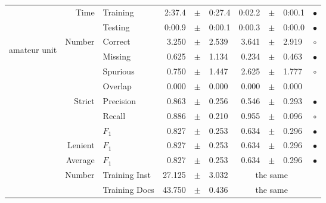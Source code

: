 \begin{longtable}{|r|r|l||rcl|rcl|c|}
\cline{2-10} & \multirow{2}{*}{      Time} &        Training &      2:37.4 &  $\pm$  &      0:27.4 &      0:02.2 &  $\pm$  &      0:00.1 & $\bullet$ \\
\cline{3-10} &                             &         Testing &      0:00.9 &  $\pm$  &      0:00.1 &      0:00.3 &  $\pm$  &      0:00.0 & $\bullet$ \\
\hline
\hline
\multirow{11}{*}{\begin{sideways}amateur unit\end{sideways} }
             & \multirow{4}{*}{    Number} &         Correct &       3.250 &  $\pm$  &       2.539 &       3.641 &  $\pm$  &       2.919 & $\circ$ \\
\cline{3-10} &                             &         Missing &       0.625 &  $\pm$  &       1.134 &       0.234 &  $\pm$  &       0.463 & $\bullet$ \\
\cline{3-10} &                             &        Spurious &       0.750 &  $\pm$  &       1.447 &       2.625 &  $\pm$  &       1.777 & $\circ$ \\
\cline{3-10} &                             &         Overlap &       0.000 &  $\pm$  &       0.000 &       0.000 &  $\pm$  &       0.000 &  \\
\cline{2-10} & \multirow{3}{*}{    Strict} &       Precision &       0.863 &  $\pm$  &       0.256 &       0.546 &  $\pm$  &       0.293 & $\bullet$ \\
\cline{3-10} &                             &          Recall &       0.886 &  $\pm$  &       0.210 &       0.955 &  $\pm$  &       0.096 & $\circ$ \\
\cline{3-10} &                             &           $F_1$ &       0.827 &  $\pm$  &       0.253 &       0.634 &  $\pm$  &       0.296 & $\bullet$ \\
\cline{2-10} &                     Lenient &           $F_1$ &       0.827 &  $\pm$  &       0.253 &       0.634 &  $\pm$  &       0.296 & $\bullet$ \\
\cline{2-10} &                     Average &           $F_1$ &       0.827 &  $\pm$  &       0.253 &       0.634 &  $\pm$  &       0.296 & $\bullet$ \\
\cline{2-10} & \multirow{2}{*}{    Number} &   Training Inst &      27.125 &  $\pm$  &       3.032 &    \multicolumn{3}{c|}{the same}         &  \\
\cline{3-10} &                             &   Training Docs &      43.750 &  $\pm$  &       0.436 &    \multicolumn{3}{c|}{the same}         &  \\

\end{longtable}
